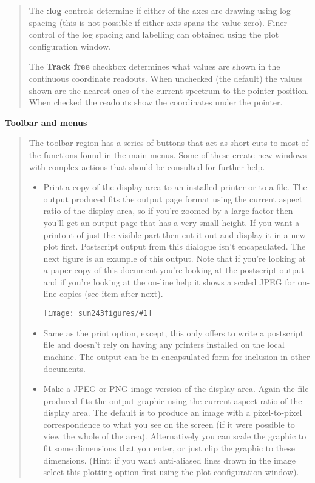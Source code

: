 \documentclass[twoside,11pt]{article}
\newcommand{\htmladdimg}[1]{}
\newcommand{\latexhtml}[2]{#1}
\renewcommand{\_}{\texttt{\symbol{95}}}
\newcommand{\clippedmainfigure}[1]
{\begin{center}
 \latexhtml{\texttt{[image: sun243\_figures/\#1]}}{\htmladdimg{#1.gif}}
 \end{center}
}
\newcommand{\inline}[1]
        {\latexhtml{\texttt{[image: sun243\_figures/\#1]}}
        {\htmladdimg[align=center]{#1.gif}}}
\newcommand{\labelitem}[1]{\textbf{#1}}
\newcommand{\subheading}[1]{\textbf{\large{#1}}}
\begin{document}
\begin{quote}
 The \labelitem{:log} controls determine if either of the axes are drawing
 using log spacing (this is not possible if either axis spans the value
 zero). Finer control of the log spacing and labelling can obtained using the
 plot configuration window.

 The \labelitem{Track free} checkbox determines what values are shown in the
 continuous coordinate readouts. When unchecked (the default) the values
 shown are the nearest ones of the current spectrum to the pointer position.
 When checked the readouts show the coordinates under the pointer.

\end{quote}

\subheading{Toolbar and menus}
\begin{quote}
 The toolbar region has a series of buttons that act as short-cuts to
 most of the functions found in the main menus. Some of these create
 new windows with complex actions that should be consulted for further
 help.

 \begin{itemize}

  \item[\inline{print}] Print a copy of the display area to an installed
  printer or to a file. The output produced fits the output page format using
  the current aspect ratio of the display area, so if you're zoomed by a large
  factor then you'll get an output page that has a very small height. If you
  want a printout of just the visible part then cut it out and display it in a
  new plot first. Postscript output from this dialogue isn't encapsulated.
  The next figure is an example of this output. Note that if you're looking at
  a paper copy of this document you're looking at the postscript output and if
  you're looking at the on-line help it shows a scaled JPEG for on-line copies
  (see item after next).

  \clippedmainfigure{printoutput}

  \item[\inline{postscriptprint}] Same as the print option, except, this only
  offers to write a postscript file and doesn't rely on having any printers
  installed on the local machine. The output can be in encapsulated form
  for inclusion in other documents.

  \item[\inline{jpegpng}] Make a JPEG or PNG image version of the display
  area. Again the file produced fits the output graphic using the current
  aspect ratio of the display area. The default is to produce an image
  with a pixel-to-pixel correspondence to what you see on the screen
  (if it were possible to view the whole of the area). Alternatively you
  can scale the graphic to fit some dimensions that you enter, or just
  clip the graphic to these dimensions. (Hint: if you want anti-aliased
  lines drawn in the image select this plotting option first using the plot
  configuration window).


\end{itemize}
\end{quote}
\end{document}
